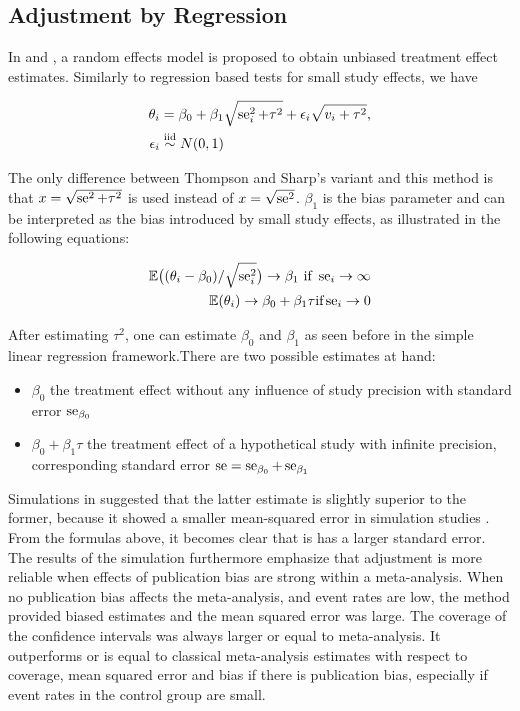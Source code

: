 \documentclass[11pt,a4paper,twoside]{book}\usepackage[]{graphicx}\usepackage[]{color}
\begin{document}
\subsection{Adjustment by Regression} \label{sec:regression.adjustment}
In \citet{limitmeta.2} and \citet{limitmeta}, a random effects model is proposed to obtain unbiased treatment effect estimates. Similarly to regression based tests for small study effects, we have

\begin{align}
\theta_i & = \beta_0 + \beta_1\sqrt{\se_i^2 + \tau^2} + \epsilon_i\sqrt{v_i + \tau^2}, \label{eq:limitmeta.regression} \\
\epsilon_i &\stackrel{\textrm{iid}}{\sim} N(0,1)
\end{align}

The only difference between Thompson and Sharp's variant and this method is that $x = \sqrt{\operatorname{se}^2 + \tau^2}$ is used instead of $x = \sqrt{\operatorname{se}^2}$. $\beta_{1}$ is the bias parameter and can be interpreted as the bias introduced by small study effects, as illustrated in the following equations:

\begin{align}
\mathbb{E}\big((\theta_i - \beta_0)/\sqrt{\se_i^2}\big) \rightarrow \beta_1 \textrm{ if } \se_i \rightarrow \infty \nonumber \\ %
\mathbb{E}(\theta_i) \rightarrow \beta_0 + \beta_1 \tau \textrm{if} \se_i \rightarrow 0 \nonumber
\end{align}

After estimating $\tau^2$, one can estimate $\beta_{0}$ and $\beta_{1}$ as seen before in the simple linear regression framework.There are two possible estimates at hand:
\begin{itemize}
\item $\beta_0$ the treatment effect without any influence of study precision with standard error $\operatorname{se}_{\beta_0}$
\item $\beta_0 + \beta_1 \tau$ the treatment effect of a hypothetical study with infinite precision, corresponding standard error $\operatorname{se} = \operatorname{se}_{\beta_0} + \operatorname{se}_{\beta_1}$
\end{itemize}

Simulations in \citet{limitmeta} suggested that the latter estimate is slightly superior to the former, because it showed a smaller mean-squared error in simulation studies \citet{limitmeta.2}. From the formulas above, it becomes clear that is has a larger standard error. The results of the simulation furthermore emphasize that adjustment is more reliable when effects of publication bias are strong within a meta-analysis. When no publication bias affects the meta-analysis, and event rates are low, the method provided biased estimates and the mean squared error was large. The coverage of the confidence intervals was always larger or equal to meta-analysis. It outperforms or is equal to classical meta-analysis estimates with respect to coverage, mean squared error and bias if there is publication bias, especially if event rates in the control group are small. 
\end{document}
